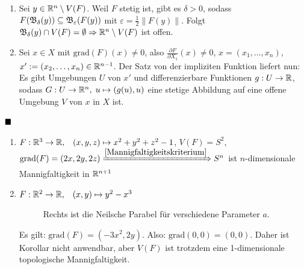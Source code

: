 \begin{beweis}
    \begin{enumerate}[label=\alph*),ref=\theplaindefinition.\alph*]
        \item Sei $y \in \mathbb{R}^n \setminus V(F)$. Weil $F$ stetig ist,
              gibt es $\delta > 0$, sodass $F(\mathfrak{B}_\delta(y)) \subseteq \mathfrak{B}_\varepsilon(F(y))$
              mit $\varepsilon = \frac{1}{2} \|F(y)\|$. Folgt
              $\mathfrak{B}_\delta(y) \cap V(F) = \emptyset \Rightarrow \mathbb{R}^n \setminus V(F)$
              ist offen.
        \item Sei $x \in X$ mit $\text{grad}(F)(x) \neq 0$, also
              \obda $\frac{\partial F}{\partial X_1} (x) \neq 0$,
              $x = (x_1, \dots, x_n)$, $x' := (x_2, \dots, x_n) \in \mathbb{R}^{n-1}$.
              Der Satz von der impliziten Funktion liefert nun:
              Es gibt Umgebungen $U$ von $x'$ und differenzierbare
              Funktionen $g: U \rightarrow \mathbb{R}$, sodass
              $G: U \rightarrow \mathbb{R}^n, \; u \mapsto (g(u), u)$
              eine stetige Abbildung auf eine offene Umgebung $V$ von
              $x$ in $X$ ist.
    \end{enumerate}  
    $\qed$
\end{beweis}

\begin{beispiel}
    \begin{enumerate}[label=\alph*)]
        \item $F: \mathbb{R}^3 \rightarrow \mathbb{R},\;\;\; (x, y, z) \mapsto x^2 + y^2 + z^2 - 1$,
              $V(F) = S^2$, $\text{grad}(F) = (2x, 2y, 2z) \xRightarrow{\ref{Mannigfaltigkeitskriterium}} S^n$
              ist $n$-dimensionale Mannigfaltigkeit in $\mathbb{R}^{n+1}$
        \item $F: \mathbb{R}^2 \rightarrow \mathbb{R}, \;\;\; (x,y) \mapsto y^2 - x^3$
            \begin{figure}[ht]
                \centering
                \subfloat[$F(x,y) = y^2 - x^3$]{
                    
                    \label{fig:semicubical-parabola-2d}
                }%
                \subfloat[$y^2 - ax^3 = 0$]{
                    
                    \label{fig:semicubical-parabola-3d}
                }%
                \label{Neilsche-Parabel}
                \caption{Rechts ist die Neilsche Parabel für verschiedene Parameter $a$.}
            \end{figure}
              Es gilt: $\text{grad}(F) = (-3x^2, 2y)$. Also: $\text{grad}(0,0) = (0,0)$.
              Daher ist Korollar \label{Mannigfaltigkeitskriterium}
              nicht anwendbar, aber $V(F)$ ist trotzdem
              eine 1-dimensionale topologische Mannigfaltigkeit.
    \end{enumerate}
\end{beispiel}

